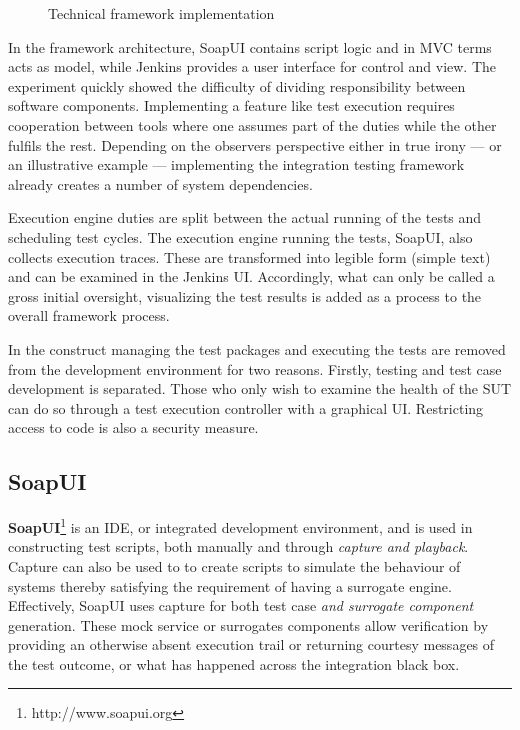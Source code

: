\documentclass[12pt,a4paper,oneside,pdftex]{report}
\begin{document}
{\begin{figure}[H]
\caption{Technical framework implementation} \label{fig:structure}
\end{figure}

In the framework architecture, SoapUI contains script logic and in MVC terms acts as model, while Jenkins provides a user interface for control and view. The experiment quickly showed the difficulty of dividing responsibility between software components. Implementing a feature like test execution requires cooperation between tools where one assumes part of the duties while the other fulfils the rest. Depending on the observers perspective either in true irony --- or an illustrative example --- implementing the integration testing framework already creates a number of system dependencies.

Execution engine duties are split between the actual running of the tests and scheduling test cycles. The execution engine running the tests, SoapUI, also collects execution traces. These are transformed into legible form (simple text) and can be examined in the Jenkins UI. Accordingly, what can only be called a gross initial oversight, visualizing the test results is added as a process to the overall framework process.

In the construct managing the test packages and executing the tests are removed from the development environment for two reasons. Firstly, testing and test case development is separated. Those who only wish to examine the health of the SUT can do so through a test execution controller with a graphical UI. Restricting access to code is also a security measure.


\subsection{SoapUI}


\textbf{SoapUI}\footnote{http://www.soapui.org} is an IDE, or integrated development environment, and is used in constructing test scripts, both manually and through \emph{capture and playback}. Capture can also be used to to create scripts to simulate the behaviour of systems thereby satisfying the requirement of having a surrogate engine. Effectively, SoapUI uses capture for both test case \emph{and surrogate component} generation. These mock service or surrogates components allow verification by providing an otherwise absent execution trail or returning courtesy messages of the test outcome, or what has happened across the integration black box.

}
\end{document}
